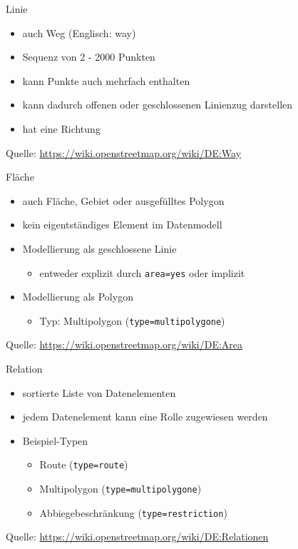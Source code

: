 \documentclass{beamer}
\begin{document}
\begin{frame}[fragile]{Linie}
\begin{itemize}
  \item auch Weg (Englisch: way)
  \item Sequenz von 2 - 2000 Punkten
  \item kann Punkte auch mehrfach enthalten
  \item kann dadurch offenen oder geschlossenen Linienzug darstellen
  \item hat eine Richtung
\end{itemize}

Quelle: \url{https://wiki.openstreetmap.org/wiki/DE:Way}

\end{frame}
\begin{frame}[fragile]{Fläche}

\begin{itemize}
  \item auch Fläche, Gebiet oder ausgefülltes Polygon
  \item kein eigentständiges Element im Datenmodell
  \item Modellierung als geschlossene Linie
  \begin{itemize}
    \item entweder explizit durch \texttt{area=yes} oder implizit
  \end{itemize}
  \item Modellierung als Polygon
  \begin{itemize}
    \item Typ: Multipolygon (\texttt{type=multipolygone})
  \end{itemize}
\end{itemize}
Quelle: \url{https://wiki.openstreetmap.org/wiki/DE:Area}
\end{frame}
\begin{frame}{Relation}
\begin{itemize}
  \item sortierte Liste von Datenelementen
  \item jedem Datenelement kann eine Rolle zugewiesen werden
  \item Beispiel-Typen
  \begin{itemize}
    \item Route (\texttt{type=route})
    \item Multipolygon (\texttt{type=multipolygone})
    \item Abbiegebeschränkung (\texttt{type=restriction})
   \end{itemize}
\end{itemize}
Quelle: \url{https://wiki.openstreetmap.org/wiki/DE:Relationen}
\end{frame}
\end{document}
